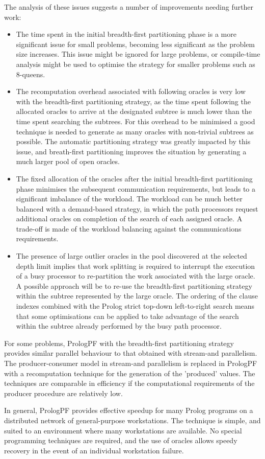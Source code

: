 The analysis of these issues suggests a number of improvements needing further work:
\begin{itemize}
\item{The time spent in the initial breadth-first partitioning phase is a more
  significant issue for small problems, becoming less significant as the problem size
  increases.  This issue might be ignored for large problems, or compile-time analysis
  might be used to optimise the strategy for smaller problems such as 8-queens.}
\item{The recomputation overhead associated with following oracles is very low with the
  breadth-first partitioning strategy, as the time spent following the allocated oracles
  to arrive at the designated subtree is much lower than the time spent searching the
  subtrees.  For this overhead to be minimised a good technique is needed to generate
  as many oracles with non-trivial subtrees as possible.  The automatic partitioning
  strategy \cite{Kle91, Sar95} was greatly impacted by this issue,  and breath-first
  partitioning improves the situation by generating a much larger pool of open oracles.}
\item{The fixed allocation of the oracles after the initial breadth-first partitioning
  phase minimises the subsequent communication requirements, but leads to a significant
  imbalance of the workload.  The workload can be much better balanced with a demand-based
  strategy, in which the path processors request additional oracles on completion of the
  search of each assigned oracle.  A trade-off is made of the workload balancing against
  the communications requirements.}
\item{The presence of large outlier oracles in the pool discovered at the
  selected depth limit implies that work splitting is required to interrupt the execution
  of a busy processor to re-partition the work associated with the large oracle.  A
  possible approach will be to re-use the breadth-first partitioning strategy within
  the subtree represented by the large oracle.  The ordering of the clause indexes combined
  with the Prolog strict top-down left-to-right search means that some optimisations can
  be applied to take advantage of the search within the subtree already performed by the
  busy path processor.}
\end{itemize}

For some problems, PrologPF with the breadth-first partitioning strategy provides similar
parallel behaviour to that obtained with stream-and parallelism.  The producer-consumer
model in stream-and parallelism is replaced in PrologPF with a recomputation technique
for the generation of the 'produced' values.  The techniques are comparable in
efficiency  if the computational requirements of the
producer procedure are relatively low.

In general, PrologPF provides effective speedup for many Prolog programs on a
distributed network of general-purpose workstations.  The technique is simple, and
suited to an environment where many workstations are available.  No special programming
techniques are required, and the use of oracles allows speedy recovery in the event
of an individual workstation failure.
